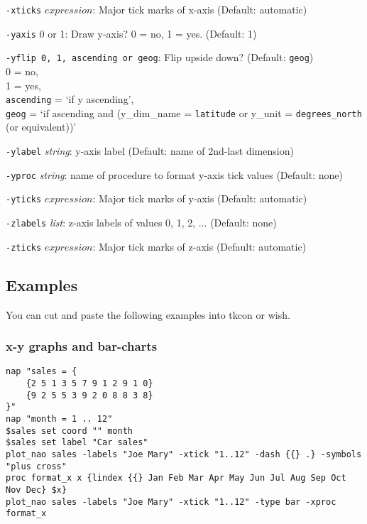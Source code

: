 \begin{simpleitems}
  \texttt{-xticks} $\mathit{expression}$:
  Major tick marks of x-axis (Default: automatic)
  \item
  \texttt{-yaxis} 0 or 1: Draw y-axis? 0 = no, 1 = yes. (Default:
  1)
  \item
  \texttt{-yflip 0, 1, ascending or geog}: Flip upside down?  (Default: \texttt{geog})
    \\
    0 = no,
    \\
    1 = yes, 
    \\
    \texttt{ascending} = `if y ascending', 
    \\
    \texttt{geog} = `if ascending and (y\_dim\_name = \texttt{latitude} or y\_unit = 
	  \texttt{degrees\_north} (or equivalent))' 
  \item
  \texttt{-ylabel} 
  \emph{string}: y-axis label (Default: name of 2nd-last dimension)
  \item
  \texttt{-yproc} 
  \emph{string}: name of procedure to format y-axis tick values
  (Default: none)
  \item
  \texttt{-yticks} $\mathit{expression}$:
  Major tick marks of y-axis (Default: automatic)
  \item
  \texttt{-zlabels} 
  \emph{list}: z-axis labels of values 0, 1, 2, $\ldots$ (Default: none)
  \item
  \texttt{-zticks} $\mathit{expression}$:
  Major tick marks of z-axis (Default:
  automatic)
\end{simpleitems}

\subsection{Examples}
    \label{plot-nao-Examples}

You can cut and paste the following examples into tkcon or wish.

\subsubsection{x-y graphs and bar-charts}
    \label{plot-nao-xy}

  \begin{verbatim}
nap "sales = {
    {2 5 1 3 5 7 9 1 2 9 1 0}
    {9 2 5 5 3 9 2 0 8 8 3 8}
}"
nap "month = 1 .. 12"
$sales set coord "" month
$sales set label "Car sales"
plot_nao sales -labels "Joe Mary" -xtick "1..12" -dash {{} .} -symbols "plus cross"
proc format_x x {lindex {{} Jan Feb Mar Apr May Jun Jul Aug Sep Oct Nov Dec} $x}
plot_nao sales -labels "Joe Mary" -xtick "1..12" -type bar -xproc format_x
\end{verbatim}

